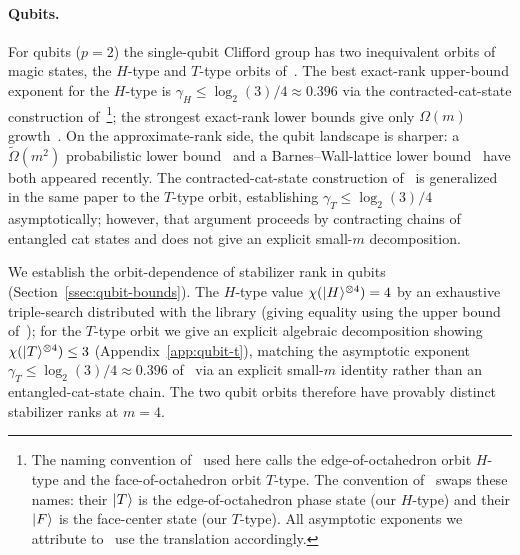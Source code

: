 \documentclass[11pt]{article}
\theoremstyle{definition}
\newcommand{\microspace}{\mspace{0.5mu}}
\newcommand{\ket}[1]{\lvert\microspace #1 \microspace \rangle}
\newcommand{\chiR}{\chi}
\begin{document}
	\paragraph{Qubits.}
	For qubits ($p = 2$) the single-qubit Clifford group has two
	inequivalent orbits of magic states, the $H$-type and
	$T$-type orbits of~\cite{bravyi2005universal}. The best exact-rank
	upper-bound exponent for the $H$-type is
	$\gamma_{H} \le \log_2(3)/4 \approx 0.396$ via the
	contracted-cat-state construction
	of~\cite{qassim2021improved, qassim2020classical}\footnote{The
	naming convention of~\cite{bravyi2005universal} used here calls
	the edge-of-octahedron orbit $H$-type and the face-of-octahedron
	orbit $T$-type. The convention
	of~\cite{qassim2021improved, qassim2020classical} swaps these
	names: their $\ket T$ is the edge-of-octahedron phase state (our
	$H$-type) and their $\ket F$ is the face-center state (our
	$T$-type). All asymptotic exponents we attribute
	to~\cite{qassim2021improved} use the translation accordingly.};
	the strongest exact-rank lower bounds give only $\Omega(m)$
	growth~\cite{peleg2022lower, labib2022stabilizer, lovitz2022techniques}.
	On the approximate-rank side, the qubit landscape is sharper: a
	$\tilde\Omega(m^2)$ probabilistic lower
	bound~\cite{mehraban2023quadratic} and a Barnes--Wall-lattice
	lower bound~\cite{kalra2025stabilizer} have both appeared
	recently. The contracted-cat-state construction
	of~\cite{qassim2021improved} is generalized in the same paper to
	the $T$-type orbit, establishing
	$\gamma_T \le \log_2(3)/4$ asymptotically; however, that argument
	proceeds by contracting chains of entangled cat states and does
	not give an explicit small-$m$ decomposition.

	We establish the orbit-dependence of stabilizer rank in qubits
	(Section~\ref{ssec:qubit-bounds}). The $H$-type value
	$\chiR(\ket H^{\otimes 4}) = 4$ by an exhaustive triple-search distributed
	with the library (giving equality using the upper bound of~\cite{bravyi2016trading}); 
	for the $T$-type orbit we give an explicit
	algebraic decomposition showing
	$\chiR(\ket T^{\otimes 4}) \le 3$
	(Appendix~\ref{app:qubit-t}), matching the asymptotic exponent
	$\gamma_T \le \log_2(3)/4 \approx 0.396$
	of~\cite{qassim2021improved} via an explicit small-$m$ identity
	rather than an entangled-cat-state chain. The two qubit orbits
	therefore have provably distinct stabilizer ranks at $m = 4$.
\end{document}
